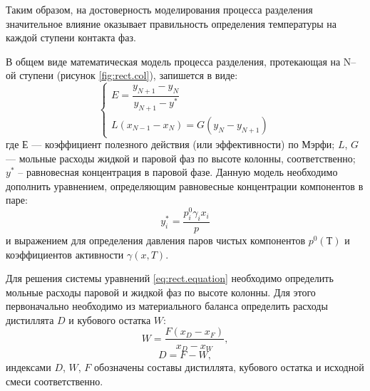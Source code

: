 Таким образом, на достоверность моделирования процесса разделения значительное влияние оказывает правильность определения температуры на каждой ступени контакта фаз.

В общем виде математическая модель процесса разделения, протекающая на N--ой ступени (рисунок \ref{fig:rect.col}), запишется в виде:
\begin{equation} \label{eq:rect.equation}
\left\lbrace 
\begin{gathered} 
E=\dfrac{y_{N+1}-y_{N}}{y_{N+1}-y^*}\\
L(x_{N-1}-x_N)=G(y_N-y_{N+1})
\end{gathered} 
\right.
\end{equation}
где $Е$ --- коэффициент полезного действия (или эффективности) по Мэрфи; $L$, $G$ --- мольные расходы жидкой и паровой фаз по высоте колонны, соответственно; $y^*$ – равновесная концентрация в паровой фазе. Данную модель необходимо дополнить уравнением, определяющим равновесные концентрации компонентов в паре:
\begin{equation}
	y_i^*=\dfrac{p_i^0 \gamma_i x_i}{p}
\end{equation}
и выражением для определения давления паров чистых компонентов $p^0(Т)$ и коэффициентов активности $\gamma(x,T)$.

Для решения системы уравнений \eqref{eq:rect.equation} необходимо определить мольные расходы паровой и жидкой фаз по высоте колонны. Для этого первоначально необходимо из материального баланса определить расходы дистиллята $D$ и кубового остатка $W$:
\begin{equation}
	W = \dfrac{F (x_D - x_F)}{x_D - x_W},
\end{equation}
\begin{equation}
	D = F - W,
\end{equation}
индексами $D$, $W$, $F$ обозначены составы дистиллята, кубового остатка и исходной смеси соответственно. 

